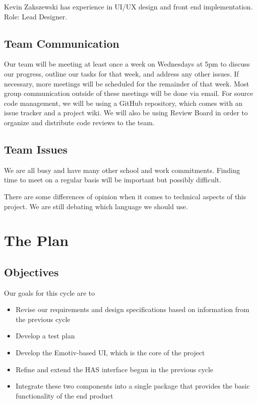 \documentclass{report}
\begin{document}
Kevin Zakszewski has experience in UI/UX design and front end
implementation. Role: Lead Designer.

\subsection*{Team Communication}

Our team will be meeting at least once a week on Wednesdays at 5pm to discuss
our progress, outline our tasks for that week, and address any other issues.
If necessary, more meetings will be scheduled for the remainder of that
week. Most group communication outside of these meetings will be done via
email. For source code management, we will be using a GitHub \cite{github} repository,
which comes with an issue tracker and a project wiki. We will also be using
Review Board in order to organize and distribute code reviews to the team.

\subsection*{Team Issues}

We are all busy and have many other school and work commitments. Finding
time to meet on a regular basis will be important but possibly difficult.

There are some differences of opinion when it comes to technical aspects of
this project. We are still debating which language we should use.

\newpage
\section*{\centering The Plan}

\subsection*{Objectives}

Our goals for this cycle are to

\begin{itemize}
    \item Revise our requirements and design specifications based on
        information from the previous cycle
    \item Develop a test plan
    \item Develop the Emotiv-based UI, which is the core of the project
    \item Refine and extend the HAS interface begun in the previous cycle
    \item Integrate these two components into a single package that provides
        the basic functionality of the end product
\end{itemize}
\end{document}
